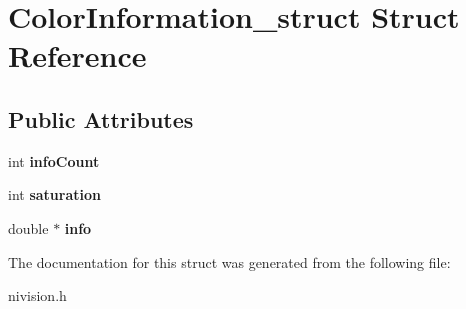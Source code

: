 \hypertarget{structColorInformation__struct}{\section{\-Color\-Information\-\_\-struct \-Struct \-Reference}
\label{structColorInformation__struct}
}
\subsection*{\-Public \-Attributes}
\begin{DoxyCompactItemize}
\item 
\hypertarget{structColorInformation__struct_a25765595c2b67369571ffe3ec0074c9a}{int {\bfseries info\-Count}}\label{structColorInformation__struct_a25765595c2b67369571ffe3ec0074c9a}

\item 
\hypertarget{structColorInformation__struct_a0ec043e4fbe310d8a1d0b8f97f00286b}{int {\bfseries saturation}}\label{structColorInformation__struct_a0ec043e4fbe310d8a1d0b8f97f00286b}

\item 
\hypertarget{structColorInformation__struct_ae1c85ff3a60ad26918b15aee6186bc1a}{double $\ast$ {\bfseries info}}\label{structColorInformation__struct_ae1c85ff3a60ad26918b15aee6186bc1a}

\end{DoxyCompactItemize}


\-The documentation for this struct was generated from the following file\-:\begin{DoxyCompactItemize}
\item 
nivision.\-h\end{DoxyCompactItemize}
